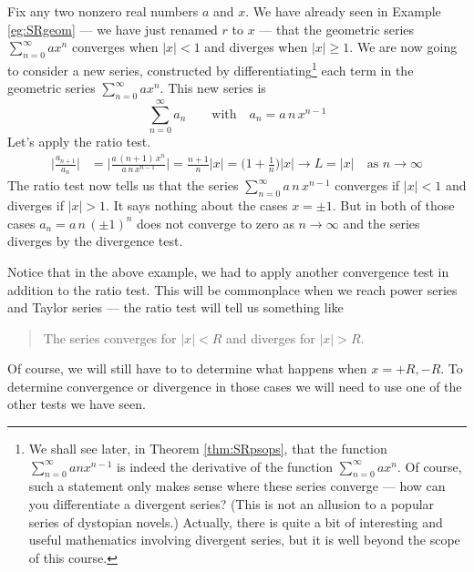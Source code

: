\begin{eg}[$\sum_{n=0}^\infty a n x^{n-1}$]\label{eg:SRratioA}
Fix any two nonzero real numbers $a$ and $x$. We have already seen
in Example \ref{eg:SRgeom} --- we have just renamed $r$ to $x$ ---
that the geometric series $\sum_{n=0}^\infty a x^n$ converges when $|x|<1$
and diverges when $|x|\ge 1$. We are now going to consider a new series,
constructed by differentiating\footnote{We shall see later, in
Theorem \ref{thm:SRpsops}, that the function
$\sum_{n=0}^\infty a n x^{n-1}$ is indeed the derivative of the
function $\sum_{n=0}^\infty a x^n$. Of course, such a statement
only makes sense where these series converge --- how can you differentiate
a divergent series? (This is not an allusion to a popular series of dystopian novels.) Actually, there is quite a bit of interesting and useful
mathematics involving divergent series, but it is well beyond the scope
of this course.} each term in the geometric series
$\sum_{n=0}^\infty a x^n$. This new series is
\begin{equation*}
\sum_{n=0}^\infty a_n\qquad\text{with}\quad a_n = a\, n\, x^{n-1}
\end{equation*}
Let's apply the ratio test.
\begin{align*}
\Big|\frac{a_{n+1}}{a_n}\Big|
&= \Big|\frac{a\, (n+1)\, x^n}{a\, n\, x^{n-1}}\Big|
 = \frac{n+1}{n} |x|
 = \Big(1+\frac{1}{n}\Big) |x|
\rightarrow L=|x|\quad\text{as $n\rightarrow\infty$}
\end{align*}
The ratio test now tells us that the series $\sum_{n=0}^\infty a\, n\, x^{n-1}$
converges if $|x|<1$ and diverges if $|x|>1$. It says nothing
about the cases $x=\pm 1$. But in both of those cases $a_n=a\,n\,(\pm 1)^n$
does not converge to zero as $n\rightarrow\infty$ and the series
diverges by the divergence test.
\end{eg}

Notice that in the above example, we had to apply another convergence
test in addition to the ratio test. This will be commonplace when we
reach power series and Taylor series --- the ratio test will tell us
something like
\begin{quote}
 The series converges for $|x|<R$ and diverges for $|x|>R$.
\end{quote}
Of course, we will still have to to determine what happens when $x=+R, -R$. To determine convergence or divergence in those cases we  will
need to use one of the other tests we have seen.

